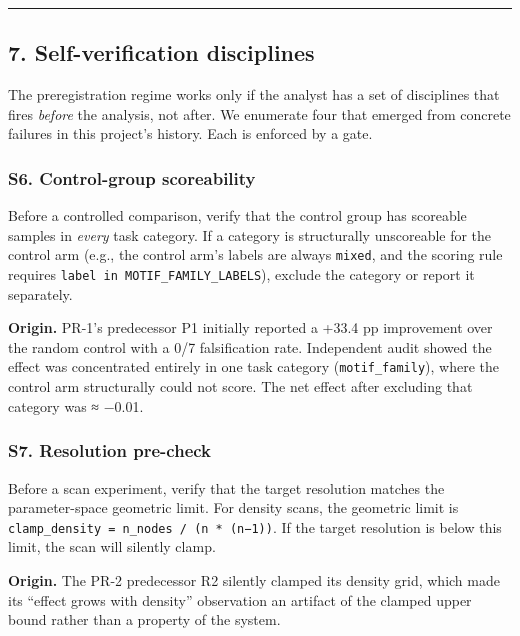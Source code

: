 \documentclass[
]{article}
\begin{document}
\begin{center}\rule{0.5\linewidth}{0.5pt}\end{center}

\subsection{7. Self-verification
disciplines}\label{self-verification-disciplines}

The preregistration regime works only if the analyst has a set of
disciplines that fires \emph{before} the analysis, not after. We
enumerate four that emerged from concrete failures in this project's
history. Each is enforced by a gate.

\subsubsection{S6. Control-group
scoreability}\label{s6.-control-group-scoreability}

Before a controlled comparison, verify that the control group has
scoreable samples in \emph{every} task category. If a category is
structurally unscoreable for the control arm (e.g., the control arm's
labels are always \texttt{mixed}, and the scoring rule requires
\texttt{label\ in\ MOTIF\_FAMILY\_LABELS}), exclude the category or
report it separately.

\textbf{Origin.} PR-1's predecessor P1 initially reported a +33.4 pp
improvement over the random control with a 0/7 falsification rate.
Independent audit showed the effect was concentrated entirely in one
task category (\texttt{motif\_family}), where the control arm
structurally could not score. The net effect after excluding that
category was ≈ −0.01.

\subsubsection{S7. Resolution pre-check}\label{s7.-resolution-pre-check}

Before a scan experiment, verify that the target resolution matches the
parameter-space geometric limit. For density scans, the geometric limit
is \texttt{clamp\_density\ =\ n\_nodes\ /\ (n\ *\ (n−1))}. If the target
resolution is below this limit, the scan will silently clamp.

\textbf{Origin.} The PR-2 predecessor R2 silently clamped its density
grid, which made its ``effect grows with density'' observation an
artifact of the clamped upper bound rather than a property of the
system.
\end{document}

